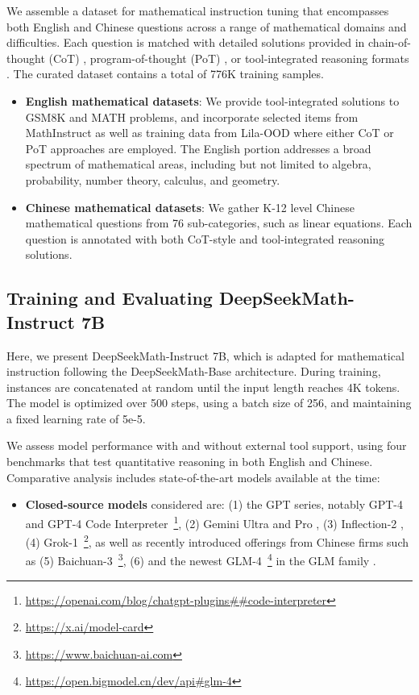 We assemble a dataset for mathematical instruction tuning that encompasses both English and Chinese questions across a range of mathematical domains and difficulties. Each question is matched with detailed solutions provided in chain-of-thought (CoT) \citep{cot}, program-of-thought (PoT) \citep{pot,pal}, or tool-integrated reasoning formats \citep{tora}. The curated dataset contains a total of 776K training samples.

\begin{itemize}[topsep=0pt]
    \item \textbf{English mathematical datasets}: We provide tool-integrated solutions to GSM8K and MATH problems, and incorporate selected items from MathInstruct \citep{MathInstruct} as well as training data from Lila-OOD \citep{lila} where either CoT or PoT approaches are employed. The English portion addresses a broad spectrum of mathematical areas, including but not limited to algebra, probability, number theory, calculus, and geometry.
    \item \textbf{Chinese mathematical datasets}: We gather K-12 level Chinese mathematical questions from 76 sub-categories, such as linear equations. Each question is annotated with both CoT-style and tool-integrated reasoning solutions.
\end{itemize}

\subsection{Training and Evaluating DeepSeekMath-Instruct 7B}

Here, we present DeepSeekMath-Instruct 7B, which is adapted for mathematical instruction following the DeepSeekMath-Base architecture. During training, instances are concatenated at random until the input length reaches 4K tokens. The model is optimized over 500 steps, using a batch size of 256, and maintaining a fixed learning rate of 5e-5.

We assess model performance with and without external tool support, using four benchmarks that test quantitative reasoning in both English and Chinese. Comparative analysis includes state-of-the-art models available at the time:

\begin{itemize}[topsep=0pt]
    \item \textbf{Closed-source models} considered are: (1) the GPT series, notably GPT-4 \citep{gpt4} and GPT-4 Code Interpreter~\footnote{\url{https://openai.com/blog/chatgpt-plugins\#\#code-interpreter}}, (2) Gemini Ultra and Pro \citep{gemini}, (3) Inflection-2 \citep{inflection-2}, (4) Grok-1~\footnote{\url{https://x.ai/model-card}}, as well as recently introduced offerings from Chinese firms such as (5) Baichuan-3~\footnote{\url{https://www.baichuan-ai.com}}, (6) and the newest GLM-4~\footnote{\url{https://open.bigmodel.cn/dev/api\#glm-4}}
    in the GLM family \citep{glm}.
\end{itemize}

